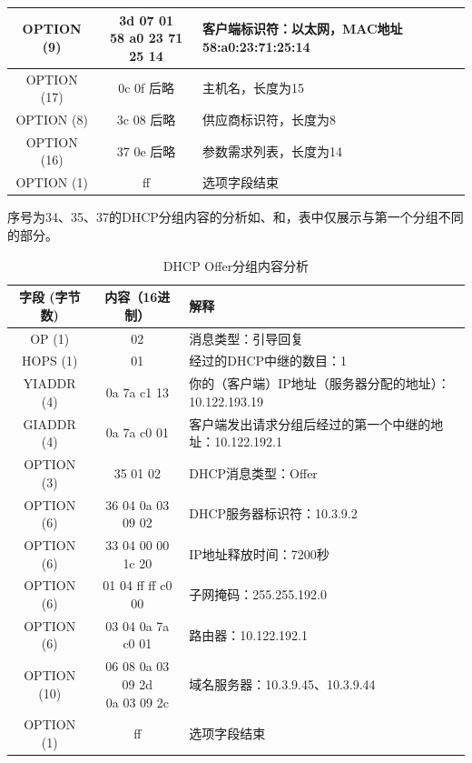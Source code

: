 \documentclass[lang=cn,11pt,a4paper,cite=authornum]{paper}
\begin{document}
\begin{table}[!htbp]
\begin{tabular}{|c|c|l|}
        \hline
        OPTION (9) & \makecell[c]{3d 07 01 \\ 58 a0 23 71 25 14} & 客户端标识符：以太网，MAC地址58:a0:23:71:25:14 \\
        \hline
        OPTION (17) & 0c 0f 后略 & 主机名，长度为15 \\
        \hline
        OPTION (8) & 3c 08 后略 & 供应商标识符，长度为8 \\
        \hline
        OPTION (16) & 37 0e 后略 & 参数需求列表，长度为14 \\
        \hline
        OPTION (1) & ff & 选项字段结束 \\
        \hline
    \end{tabular}
\end{table}

序号为34、35、37的DHCP分组内容的分析如、和，表中仅展示与第一个分组不同的部分。

\begin{table}[!htbp]
    \centering
    \caption{DHCP Offer分组内容分析\label{tab:dhcp2res}}
    \begin{tabular}{|c|c|l|}
        \hline
        字段 (字节数) & 内容（16进制） & 解释 \\
        \hline
        OP (1) & 02 & 消息类型：引导回复 \\
        \hline
        HOPS (1) & 01 & 经过的DHCP中继的数目：1 \\
        \hline
        YIADDR (4) & 0a 7a c1 13 & 你的（客户端）IP地址（服务器分配的地址）：10.122.193.19 \\
        \hline
        GIADDR (4) & 0a 7a c0 01 & 客户端发出请求分组后经过的第一个中继的地址：10.122.192.1 \\
        \hline
        OPTION (3) & 35 01 02 & DHCP消息类型：Offer \\
        \hline
        OPTION (6) & 36 04 0a 03 09 02 & DHCP服务器标识符：10.3.9.2 \\
        \hline
        OPTION (6) & 33 04 00 00 1c 20 & IP地址释放时间：7200秒 \\
        \hline
        OPTION (6) & 01 04 ff ff c0 00 & 子网掩码：255.255.192.0 \\
        \hline
        OPTION (6) & 03 04 0a 7a c0 01 & 路由器：10.122.192.1 \\
        \hline
        OPTION (10) & \makecell[c]{06 08 0a 03 09 2d \\ 0a 03 09 2c} & 域名服务器：10.3.9.45、10.3.9.44 \\
        \hline
        OPTION (1) & ff & 选项字段结束 \\
        \hline
    \end{tabular}
\end{table}
\end{document}
